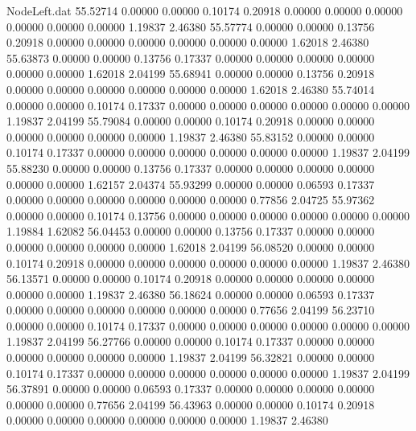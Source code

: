 \begin{filecontents}{NodeLeft.dat}
  55.52714    0.00000    0.00000     0.10174    0.20918    0.00000    0.00000    0.00000    0.00000    0.00000    0.00000    1.19837    2.46380
  55.57774    0.00000    0.00000     0.13756    0.20918    0.00000    0.00000    0.00000    0.00000    0.00000    0.00000    1.62018    2.46380
  55.63873    0.00000    0.00000     0.13756    0.17337    0.00000    0.00000    0.00000    0.00000    0.00000    0.00000    1.62018    2.04199
  55.68941    0.00000    0.00000     0.13756    0.20918    0.00000    0.00000    0.00000    0.00000    0.00000    0.00000    1.62018    2.46380
  55.74014    0.00000    0.00000     0.10174    0.17337    0.00000    0.00000    0.00000    0.00000    0.00000    0.00000    1.19837    2.04199
  55.79084    0.00000    0.00000     0.10174    0.20918    0.00000    0.00000    0.00000    0.00000    0.00000    0.00000    1.19837    2.46380
  55.83152    0.00000    0.00000     0.10174    0.17337    0.00000    0.00000    0.00000    0.00000    0.00000    0.00000    1.19837    2.04199
  55.88230    0.00000    0.00000     0.13756    0.17337    0.00000    0.00000    0.00000    0.00000    0.00000    0.00000    1.62157    2.04374
  55.93299    0.00000    0.00000     0.06593    0.17337    0.00000    0.00000    0.00000    0.00000    0.00000    0.00000    0.77856    2.04725
  55.97362    0.00000    0.00000     0.10174    0.13756    0.00000    0.00000    0.00000    0.00000    0.00000    0.00000    1.19884    1.62082
  56.04453    0.00000    0.00000     0.13756    0.17337    0.00000    0.00000    0.00000    0.00000    0.00000    0.00000    1.62018    2.04199
  56.08520    0.00000    0.00000     0.10174    0.20918    0.00000    0.00000    0.00000    0.00000    0.00000    0.00000    1.19837    2.46380
  56.13571    0.00000    0.00000     0.10174    0.20918    0.00000    0.00000    0.00000    0.00000    0.00000    0.00000    1.19837    2.46380
  56.18624    0.00000    0.00000     0.06593    0.17337    0.00000    0.00000    0.00000    0.00000    0.00000    0.00000    0.77656    2.04199
  56.23710    0.00000    0.00000     0.10174    0.17337    0.00000    0.00000    0.00000    0.00000    0.00000    0.00000    1.19837    2.04199
  56.27766    0.00000    0.00000     0.10174    0.17337    0.00000    0.00000    0.00000    0.00000    0.00000    0.00000    1.19837    2.04199
  56.32821    0.00000    0.00000     0.10174    0.17337    0.00000    0.00000    0.00000    0.00000    0.00000    0.00000    1.19837    2.04199
  56.37891    0.00000    0.00000     0.06593    0.17337    0.00000    0.00000    0.00000    0.00000    0.00000    0.00000    0.77656    2.04199
  56.43963    0.00000    0.00000     0.10174    0.20918    0.00000    0.00000    0.00000    0.00000    0.00000    0.00000    1.19837    2.46380

\end{filecontents}
